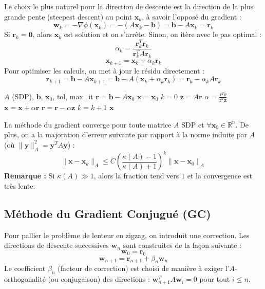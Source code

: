 Le choix le plus naturel pour la direction de descente est la direction de la plus grande pente (steepest descent) au point $\mathbf{x}_k$, à savoir l'opposé du gradient :
$$\mathbf{w}_k = -\nabla \phi(\mathbf{x}_k) = -(A\mathbf{x}_k - \mathbf{b}) = \mathbf{b} - A\mathbf{x}_k = \mathbf{r}_k$$
Si $\mathbf{r}_k = \mathbf{0}$, alors $\mathbf{x}_k$ est solution et on s'arrête. Sinon, on itère avec le pas optimal :
$$\alpha_k = \frac{\mathbf{r}_k^T \mathbf{r}_k}{\mathbf{r}_k^T A \mathbf{r}_k}$$
$$\mathbf{x}_{k+1} = \mathbf{x}_k + \alpha_k \mathbf{r}_k$$
Pour optimiser les calculs, on met à jour le résidu directement :
$$\mathbf{r}_{k+1} = \mathbf{b} - A\mathbf{x}_{k+1} = \mathbf{b} - A(\mathbf{x}_k + \alpha_k \mathbf{r}_k) = \mathbf{r}_k - \alpha_k A \mathbf{r}_k$$

\begin{algorithm}[H]
\caption{Méthode du Gradient à Pas Optimal}
\begin{algorithmic}[1]
\Require $A$ (SDP), $\mathbf{b}$, $\mathbf{x}_0$, tol, max\_it
\State $\mathbf{r} = \mathbf{b} - A \mathbf{x}_0$
\State $\mathbf{x} = \mathbf{x}_0$
\State $k = 0$
    \State $\mathbf{z} = A \mathbf{r}$
    \State $\alpha = \frac{\mathbf{r}^T \mathbf{r}}{\mathbf{r}^T \mathbf{z}}$
    \State $\mathbf{x} = \mathbf{x} + \alpha \mathbf{r}$
    \State $\mathbf{r} = \mathbf{r} - \alpha \mathbf{z}$
    \State $k = k + 1$
\EndWhile
\State \Return $\mathbf{x}$
\end{algorithmic}
\end{algorithm}

\begin{theoreme}
La méthode du gradient converge pour toute matrice $A$ SDP et $\forall \mathbf{x}_0 \in \mathbb{R}^n$. De plus, on a la majoration d'erreur suivante par rapport à la norme induite par $A$ (où $\|\mathbf{y}\|_A^2 = \mathbf{y}^T A \mathbf{y}$) :
$$\|\mathbf{x} - \mathbf{x}_k\|_A \le C \left( \frac{\kappa(A) - 1}{\kappa(A) + 1} \right)^k \|\mathbf{x} - \mathbf{x}_0\|_A$$
\textbf{Remarque :} Si $\kappa(A) \gg 1$, alors la fraction tend vers $1$ et la convergence est très lente.
\end{theoreme}

\subsection{Méthode du Gradient Conjugué (GC)}

Pour pallier le problème de lenteur en zigzag, on introduit une correction. Les directions de descente successives $\mathbf{w}_n$ sont construites de la façon suivante :
$$\mathbf{w}_0 = \mathbf{r}_0$$
$$\mathbf{w}_{n+1} = \mathbf{r}_{n+1} + \beta_n \mathbf{w}_n$$
Le coefficient $\beta_n$ (facteur de correction) est choisi de manière à exiger l'$A$-orthogonalité (ou conjugaison) des directions : $\mathbf{w}_{n+1}^T A \mathbf{w}_i = 0$ pour tout $i \le n$.


